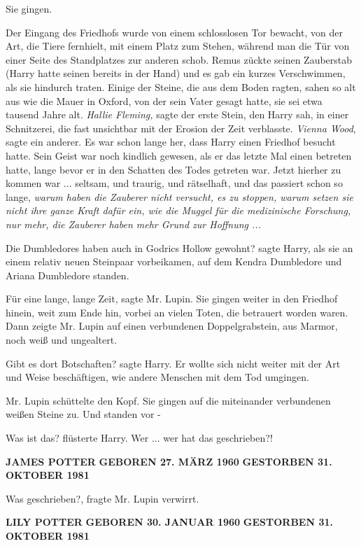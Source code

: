 Sie gingen.

Der Eingang des Friedhofs wurde von einem schlosslosen Tor bewacht, von der Art,
die Tiere fernhielt, mit einem Platz zum Stehen, während man die Tür von einer
Seite des Standplatzes zur anderen schob. Remus zückte seinen Zauberstab (Harry
hatte seinen bereits in der Hand) und es gab ein kurzes Verschwimmen, als sie
hindurch traten. Einige der Steine, die aus dem Boden ragten, sahen so alt aus
wie die Mauer in Oxford, von der sein Vater gesagt hatte, sie sei etwa tausend
Jahre alt. \emph{Hallie Fleming,} sagte der erste Stein, den Harry sah, in einer
Schnitzerei, die fast unsichtbar mit der Erosion der Zeit verblasste.
\emph{Vienna Wood}, sagte ein anderer. Es war schon lange her, dass Harry einen
Friedhof besucht hatte. Sein Geist war noch kindlich gewesen, als er das letzte
Mal einen betreten hatte, lange bevor er in den Schatten des Todes getreten war.
Jetzt hierher zu kommen war ... seltsam, und traurig, und rätselhaft, und das
passiert schon so lange, \emph{warum haben die Zauberer nicht versucht, es zu
stoppen, warum setzen sie nicht ihre ganze Kraft dafür ein, wie die Muggel für
die medizinische Forschung, nur mehr, die Zauberer haben mehr Grund zur
Hoffnung ...}

\glqq{}Die Dumbledores haben auch in Godrics Hollow gewohnt?\grqq{} sagte Harry,
als sie an einem relativ neuen Steinpaar vorbeikamen, auf dem Kendra Dumbledore
und Ariana Dumbledore standen.

\glqq{}Für eine lange, lange Zeit\grqq{}, sagte Mr. Lupin. Sie gingen weiter in
den Friedhof hinein, weit zum Ende hin, vorbei an vielen Toten, die betrauert
worden waren. Dann zeigte Mr. Lupin auf einen verbundenen Doppelgrabstein, aus
Marmor, noch weiß und ungealtert.

\glqq{}Gibt es dort Botschaften?\grqq{} sagte Harry. Er wollte sich nicht weiter
mit der Art und Weise beschäftigen, wie andere Menschen mit dem Tod umgingen.

Mr. Lupin schüttelte den Kopf. Sie gingen auf die miteinander verbundenen weißen
Steine zu. Und standen vor -

\glqq{}Was ist das?\grqq{} flüsterte Harry. \glqq{}Wer ... wer hat das
geschrieben?!\grqq{}

\textbf{JAMES POTTER} \textbf{GEBOREN 27. MÄRZ 1960} \textbf{GESTORBEN 31.
OKTOBER 1981}

\glqq{}Was geschrieben?\grqq{}, fragte Mr. Lupin verwirrt.

\textbf{LILY POTTER} \textbf{GEBOREN 30. JANUAR 1960} \textbf{GESTORBEN 31.
OKTOBER 1981}

